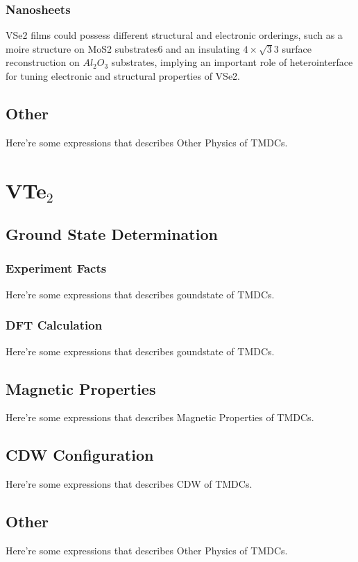 \subsection{Nanosheets}
VSe2 films could possess different structural and electronic orderings, such as a moire structure on MoS2 substrates6 and an insulating $4 \times \sqrt{3}3$ surface reconstruction on $Al_2O_3$ substrates, implying an important role of heterointerface for tuning electronic and structural properties of VSe2\cite{doi:10.1021/acs.nanolett.8b01764}.

\section{Other}
Here're some expressions that describes Other Physics of TMDCs.

\chapter{VTe$_2$}

\section{Ground State Determination}
\subsection{Experiment Facts}
Here're some expressions that describes goundstate of TMDCs.

\subsection{DFT Calculation}
Here're some expressions that describes goundstate of TMDCs.

\section{Magnetic Properties}
Here're some expressions that describes Magnetic Properties of TMDCs.

\section{CDW Configuration}
Here're some expressions that describes CDW of TMDCs.

\section{Other}
Here're some expressions that describes Other Physics of TMDCs.